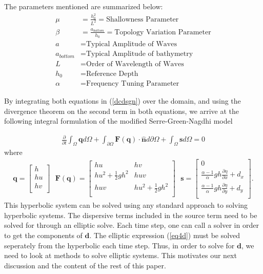 The parameters mentioned are summarized below:
\begin{align*}
    \mu &= \frac{h_0^2}{L^2} = \text{Shallowness Parameter} \\
    \beta &= \frac{a_{bottom}}{h_0} = \text{Topology Variation Parameter} \\
    a &= \text{Typical Amplitude of Waves} \\
    a_{bottom} &= \text{Typical Amplitude of bathymetry} \\
    L &= \text{Order of Wavelength of Waves} \\
    h_0 &= \text{Reference Depth} \\
    \alpha &= \text{Frequency Tuning Parameter}
\end{align*}

By integrating both equations in (\ref{dcdsgn}) over the domain, and using the divergence theorem on the second term in both equations, we arrive at the following integral formulation of the modified Serre-Green-Nagdhi model

\begin{align}
    \frac{\partial}{\partial t} \int_{\Omega} \textbf{q} d\Omega + \int_{\partial \Omega} \textbf{F}(\textbf{q}) \cdot \hat{\textbf{n}} d\partial \Omega + \int_{\Omega} \textbf{s} d\Omega = 0
\end{align}
where
\begin{align}
    \textbf{q} =
    \begin{bmatrix}
        h \\
        h u \\
        h v \\
    \end{bmatrix}\ \ \
    \textbf{F}(\textbf{q}) =
    \begin{bmatrix}
        h u & h v \\
        h u^2 + \frac{1}{2} g h^2 & h u v \\
        h u v & h u^2 + \frac{1}{2} g h^2 \\
    \end{bmatrix}\ \ \
    \textbf{s} =
    \begin{bmatrix}
        0 \\
        \frac{\alpha - 1}{\alpha} g h \frac{\partial \eta}{\partial x} + d_x \\
        \frac{\alpha - 1}{\alpha} g h \frac{\partial \eta}{\partial y} + d_y \\
    \end{bmatrix}.
\end{align}
This hyperbolic system can be solved using any standard approach to solving hyperbolic systems. The dispersive terms included in the source term need to be solved for through an elliptic solve. Each time step, one can call a solver in order to get the components of $\textbf{d}$. The elliptic expression (\ref{eq4d}) must be solved seperately from the hyperbolic each time step. Thus, in order to solve for $\textbf{d}$, we need to look at methods to solve elliptic systems. This motivates our next discussion and the content of the rest of this paper.


